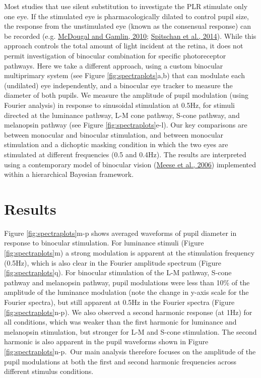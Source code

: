 \documentclass[
]{article}
\begin{document}
Most studies that use silent substitution to investigate the PLR stimulate only one eye. If the stimulated eye is pharmacologically dilated to control pupil size, the response from the unstimulated eye (known as the consensual response) can be recorded (e.g. \protect\hyperlink{ref-McDougal2010}{McDougal and Gamlin, 2010}; \protect\hyperlink{ref-Spitschan2014}{Spitschan et al., 2014}). While this approach controls the total amount of light incident at the retina, it does not permit investigation of binocular combination for specific photoreceptor pathways. Here we take a different approach, using a custom binocular multiprimary system (see Figure \ref{fig:spectraplots}a,b) that can modulate each (undilated) eye independently, and a binocular eye tracker to measure the diameter of both pupils. We measure the amplitude of pupil modulation (using Fourier analysis) in response to sinusoidal stimulation at 0.5Hz, for stimuli directed at the luminance pathway, L-M cone pathway, S-cone pathway, and melanopsin pathway (see Figure \ref{fig:spectraplots}e-l). Our key comparisons are between monocular and binocular stimulation, and between monocular stimulation and a dichoptic masking condition in which the two eyes are stimulated at different frequencies (0.5 and 0.4Hz). The results are interpreted using a contemporary model of binocular vision (\protect\hyperlink{ref-Meese2006}{Meese et al., 2006}) implemented within a hierarchical Bayesian framework.

\hypertarget{results}{%
\section{Results}\label{results}}

Figure \ref{fig:spectraplots}m-p shows averaged waveforms of pupil diameter in response to binocular stimulation. For luminance stimuli (Figure \ref{fig:spectraplots}m) a strong modulation is apparent at the stimulation frequency (0.5Hz), which is also clear in the Fourier amplitude spectrum (Figure \ref{fig:spectraplots}q). For binocular stimulation of the L-M pathway, S-cone pathway and melanopsin pathway, pupil modulations were less than 10\% of the amplitude of the luminance modulation (note the change in y-axis scale for the Fourier spectra), but still apparent at 0.5Hz in the Fourier spectra (Figure \ref{fig:spectraplots}n-p). We also observed a second harmonic response (at 1Hz) for all conditions, which was weaker than the first harmonic for luminance and melanopsin stimulation, but stronger for L-M and S-cone stimulation. The second harmonic is also apparent in the pupil waveforms shown in Figure \ref{fig:spectraplots}n-p.~Our main analysis therefore focuses on the amplitude of the pupil modulations at both the first and second harmonic frequencies across different stimulus conditions.
\end{document}
